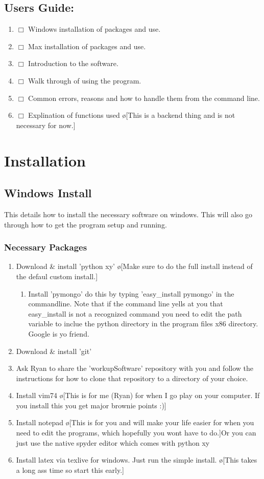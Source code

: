 \documentclass[10pt]{book}
\begin{document}
\subsection{Users Guide:}
\begin{enumerate}
    \item $\Box$ Windows installation of packages and use.
    \item $\Box$ Max installation of packages and use.
    \item $\Box$ Introduction to the software.
    \item $\Box$ Walk through of using the program.
    \item $\Box$ Common errors, reasons and how to handle them from the command line.
    \item $\Box$ Explination of functions used \o[This is a backend thing and is not necessary for now.]{}
\end{enumerate}
\section{Installation}
\subsection{Windows Install}
This details how to install the necessary software on windows. This will also go through how to get the program setup and running.
\subsubsection{Necessary Packages}
\begin{enumerate}
    \item Download \& install 'python xy' \o[Make sure to do the full install instead of the defaul custom install.]{}
        \begin{enumerate}
            \item Install 'pymongo' do this by typing 'easy_install pymongo' in the commandline. Note that if the command line yells at you that easy_install is not a recognized command you need to edit the path variable to inclue the python directory in the program files x86 directory. Google is yo friend.
        \end{enumerate}
    \item Download \& install 'git'
    \item Ask Ryan to share the 'workupSoftware' repository with you and follow the instructions for how to clone that repository to a directory of your choice.
    \item Install vim74 \o[This is for me (Ryan) for when I go play on your computer. If you install this you get major brownie points :)]
    \item Install notepad \o[This is for you and will make your life easier for when you need to edit the programs, which hopefully you wont have to do.]{Or you can just use the native spyder editor which comes with python xy}
    \item Install latex via texlive for windows. Just run the simple install. \o[This takes a long ass time so start this early.]{}
\end{enumerate}
\end{document}
